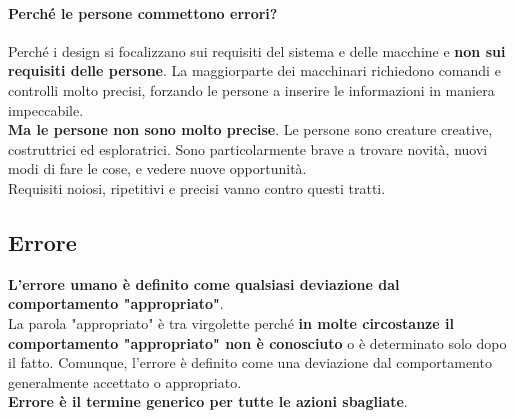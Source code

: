 \documentclass[10pt]{article}
\begin{document}
\paragraph{Perché le persone commettono errori?} Perché i design si focalizzano sui requisiti del sistema e delle macchine e \textbf{non sui requisiti delle persone}. La maggiorparte dei macchinari richiedono comandi e controlli molto precisi, forzando le persone a inserire le informazioni in maniera impeccabile.\\
\textbf{Ma le persone non sono molto precise}. Le persone sono creature creative, costruttrici ed esploratrici. Sono particolarmente brave a trovare novità, nuovi modi di fare le cose, e vedere nuove opportunità.\\
Requisiti noiosi, ripetitivi e precisi vanno contro questi tratti.
\subsection{Errore}
\textbf{L'errore umano è definito come qualsiasi deviazione dal comportamento "appropriato"}.\\
La parola "appropriato" è tra virgolette perché \textbf{in molte circostanze il comportamento "appropriato" non è conosciuto} o è determinato solo dopo il fatto. Comunque, l'errore è definito come una deviazione dal comportamento generalmente accettato o appropriato.\\
\textbf{Errore è il termine generico per tutte le azioni sbagliate}.
\end{document}
